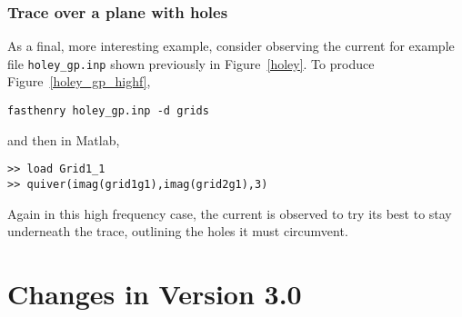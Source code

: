 \subsubsection{Trace over a plane with holes}
As a final, more interesting example, consider observing the current for
example file {\tt holey\_gp.inp} shown previously in
Figure~\ref{holey}.  To produce Figure~\ref{holey_gp_highf},
\begin{verbatim}
fasthenry holey_gp.inp -d grids
\end{verbatim}
and then in Matlab,
\begin{verbatim}
>> load Grid1_1
>> quiver(imag(grid1g1),imag(grid2g1),3)
\end{verbatim}

Again in this high frequency case, the current is observed to try its
best to stay underneath the trace, outlining the holes it must circumvent.


\appendix




\section{Changes in Version 3.0}
\label{changes}

